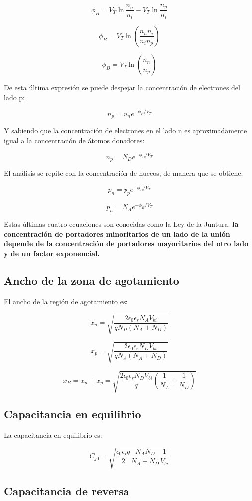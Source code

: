 \[ \phi_B = V_T \ln \dfrac{n_n}{n_i} - V_T \ln \dfrac{n_p}{n_i} \]

\[ \phi_B = V_T \ln \left( \dfrac{n_n n_i}{n_i n_p} \right) \]

\[ \phi_B = V_T \ln \left( \dfrac{n_n}{n_p} \right) \]

De esta última expresión se puede despejar la concentración de electrones del lado p:

\[ n_p = n_n e^{-\phi_B/V_T} \]

Y sabiendo que la concentración de electrones en el lado n es aproximadamente igual a la concentración de átomos donadores:

\[ \boxed{n_p = N_D e^{-\phi_B/V_T}} \]

El análisis se repite con la concentración de huecos, de manera que se obtiene:

\[ p_n = p_p e^{-\phi_B/V_T} \]

\[ \boxed{p_n = N_A e^{-\phi_B/V_T}} \]

Estas últimas cuatro ecuaciones son conocidas  como la Ley de la Juntura: \textbf{la concentración de portadores minoritarios de un lado de la unión depende de la concentración de portadores mayoritarios del otro lado y de un factor exponencial.}

\subsection{Ancho de la zona de agotamiento}

El ancho de la región de agotamiento es:

\[ x_n = \sqrt{\dfrac{2 \epsilon_0 \epsilon_r N_A V_{bi}}{q N_D (N_A + N_D)}} \]

\[ x_p = \sqrt{\dfrac{2 \epsilon_0 \epsilon_r N_D V_{bi}}{q N_A (N_A + N_D)}} \]

\[ x_B = x_n + x_p = \sqrt{\dfrac{2 \epsilon_0 \epsilon_r N_D V_{bi}}{q} \left( \dfrac{1}{N_A} + \dfrac{1}{N_D} \right)} \]

\subsection{Capacitancia en equilibrio}

La capacitancia en equilibrio es:

\[ C_{j0} = \sqrt{\dfrac{\epsilon_0 \epsilon_r q}{2} \dfrac{N_A N_D}{N_A + N_D} \dfrac{1}{V_{bi}} } \]


\subsection{Capacitancia de reversa}

